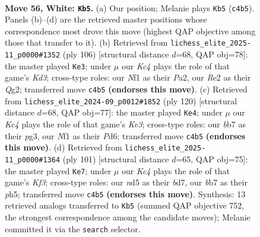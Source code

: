 \documentclass[11pt]{article}
\begin{document}
\clearpage

\begin{figure}[p]\centering
\begin{subfigure}{0.46\textwidth}\centering
\resizebox{\linewidth}{!}{%
\newchessgame
\chessboard[
  setfen={8/1b3pk1/6p1/3n4/2KR3P/2q5/4R2P/5N2 w - - 19 56},
  showmover=false,
  pgfstyle=straightmove, color=movearrow, markmove={c4-b5}
]}
\caption{}
\end{subfigure}\hfill
\begin{subfigure}{0.46\textwidth}\centering
\resizebox{\linewidth}{!}{%
\newchessgame
\chessboard[
  setfen={8/p4bpk/6p1/8/2q3P1/3K4/P2R2Q1/8 w - - 17 54},
  showmover=false,
  pgfstyle=straightmove, color=movearrow, markmove={d3-e3}
]}
\caption{}
\end{subfigure}
\\[4pt]
\begin{subfigure}{0.46\textwidth}\centering
\resizebox{\linewidth}{!}{%
\newchessgame
\chessboard[
  setfen={8/3k4/3P3p/4n3/p7/P3K1p1/5q2/3RR3 w - - 2 61},
  showmover=false,
  pgfstyle=straightmove, color=movearrow, markmove={e3-e4}
]}
\caption{}
\end{subfigure}\hfill
\begin{subfigure}{0.46\textwidth}\centering
\resizebox{\linewidth}{!}{%
\newchessgame
\chessboard[
  setfen={8/3B4/5kQp/2p1r2P/N3p3/2P2p1K/8/8 b - - 6 51},
  showmover=false,
  pgfstyle=straightmove, color=movearrow, markmove={f6-e7}
]}
\caption{}
\end{subfigure}
\caption{\textbf{Move 56, White: \texttt{Kb5}.} (a) Our position; Melanie plays \texttt{Kb5} (\texttt{c4b5}). Panels (b)--(d) are the retrieved master positions whose correspondence most drove this move (highest QAP objective among those that transfer to it). (b) Retrieved from \texttt{lichess\_elite\_2025-11\_p0000\#1352} (ply 106) [structural distance $d$=68, QAP obj=78]: the master played \texttt{Ke3}; under $\mu$ our \emph{Kc4} plays the role of that game's \emph{Kd3}; cross-type roles: our \emph{N}f1 as their \emph{P}a2, our \emph{R}e2 as their \emph{Q}g2; transferred move \texttt{c4b5} \textbf{(endorses this move)}. (c) Retrieved from \texttt{lichess\_elite\_2024-09\_p0012\#1852} (ply 120) [structural distance $d$=68, QAP obj=77]: the master played \texttt{Ke4}; under $\mu$ our \emph{Kc4} plays the role of that game's \emph{Ke3}; cross-type roles: our \emph{b}b7 as their \emph{p}g3, our \emph{N}f1 as their \emph{P}d6; transferred move \texttt{c4b5} \textbf{(endorses this move)}. (d) Retrieved from \texttt{lichess\_elite\_2025-11\_p0000\#1364} (ply 101) [structural distance $d$=65, QAP obj=75]: the master played \texttt{Ke7}; under $\mu$ our \emph{Kc4} plays the role of that game's \emph{Kf3}; cross-type roles: our \emph{n}d5 as their \emph{b}d7, our \emph{b}b7 as their \emph{p}h5; transferred move \texttt{c4b5} \textbf{(endorses this move)}. Synthesis: 13 retrieved analogs transferred to \texttt{Kb5} (summed QAP objective 752, the strongest correspondence among the candidate moves); Melanie committed it via the \texttt{search} selector.}
\label{fig:thought-m110}
\end{figure}
\end{document}
